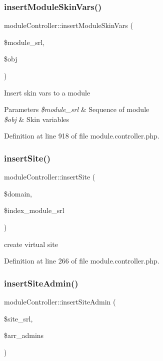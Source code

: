 \subsubsection{\texorpdfstring{insert\+Module\+Skin\+Vars()}{insertModuleSkinVars()}}
{\footnotesize\ttfamily module\+Controller\+::insert\+Module\+Skin\+Vars (\begin{DoxyParamCaption}\item[{}]{\$module\+\_\+srl,  }\item[{}]{\$obj }\end{DoxyParamCaption})}

Insert skin vars to a module 
\begin{DoxyParams}{Parameters}
{\em \$module\+\_\+srl} & Sequence of module \\
\hline
{\em \$obj} & Skin variables \\
\hline
\end{DoxyParams}


Definition at line 918 of file module.\+controller.\+php.

\hypertarget{classmoduleController_acca9e2ce3fbb24f614816bb4c34a5506}{}\label{classmoduleController_acca9e2ce3fbb24f614816bb4c34a5506} 
\subsubsection{\texorpdfstring{insert\+Site()}{insertSite()}}
{\footnotesize\ttfamily module\+Controller\+::insert\+Site (\begin{DoxyParamCaption}\item[{}]{\$domain,  }\item[{}]{\$index\+\_\+module\+\_\+srl }\end{DoxyParamCaption})}



create virtual site 



Definition at line 266 of file module.\+controller.\+php.

\hypertarget{classmoduleController_a970ea23d2ebfdb1353139923a05a173a}{}\label{classmoduleController_a970ea23d2ebfdb1353139923a05a173a} 
\subsubsection{\texorpdfstring{insert\+Site\+Admin()}{insertSiteAdmin()}}
{\footnotesize\ttfamily module\+Controller\+::insert\+Site\+Admin (\begin{DoxyParamCaption}\item[{}]{\$site\+\_\+srl,  }\item[{}]{\$arr\+\_\+admins }\end{DoxyParamCaption})}



